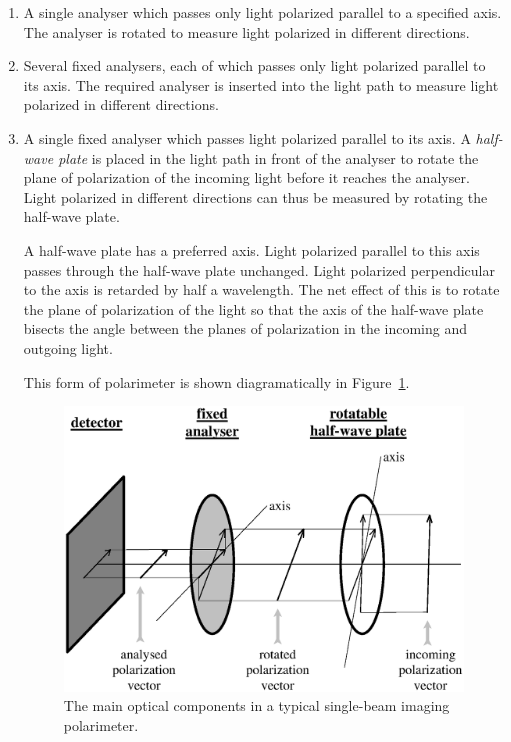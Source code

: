 \documentclass[twoside,11pt]{article}
\newenvironment{latexonly}{}{}
\newcommand{\latex}[1]{#1}
\newcommand{\html}[1]{}
\renewcommand{\_}{\texttt{\symbol{95}}}
\begin{document}
\begin{enumerate}

\item A single analyser which passes only light polarized parallel to a
specified axis. The analyser is rotated to measure light polarized in
different directions.

\item Several fixed analysers, each of which passes only light polarized 
parallel to its axis. The required analyser is inserted into the light path
to measure light polarized in different directions.

\item A single fixed analyser which passes light polarized parallel to its axis.
A \emph{half-wave plate} is placed in the light path in front of the
analyser to rotate the plane of polarization of the incoming light
before it reaches the analyser. Light polarized in different directions
can thus be measured by rotating the half-wave plate.

A half-wave plate has a preferred axis. Light polarized parallel to this
axis passes through the half-wave plate unchanged. Light polarized
perpendicular to the axis is retarded by half a wavelength. The net
effect of this is to  rotate the plane of polarization of the light so
that the axis of the half-wave plate bisects the angle between the planes 
of polarization in the incoming and outgoing light.

This form of polarimeter is shown diagramatically in 
\latex{Figure~\ref{fig:singopt}.} \html{the next figure:}

\begin{latexonly}
  \vspace{2mm}
  \begin{figure}[htb]
  \begin{center}
  \includegraphics[clip,scale=0.5]{sun223_figures/singopt.eps}
  \caption{The main optical components in a typical single-beam imaging polarimeter.}
  \label{fig:singopt}
  \end{center}
  \end{figure}
\end{latexonly}


\end{enumerate}
\end{document}

